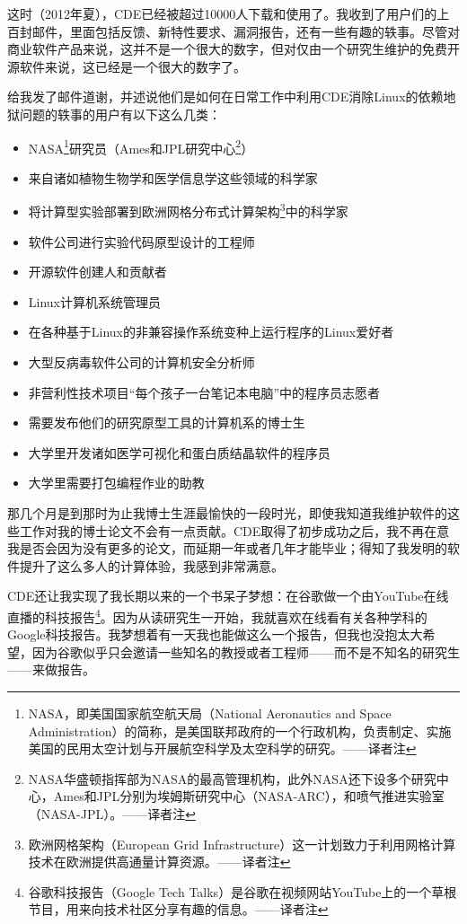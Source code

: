 \documentclass[letter,12pt]{book}
\begin{document}
\begin{CJK}{UTF8}{gbsn}
这时（2012年夏），CDE已经被超过10000人下载和使用了。我收到了用户们的上百封邮件，里面包括反馈、新特性要求、漏洞报告，还有一些有趣的轶事。尽管对商业软件产品来说，这并不是一个很大的数字，但对仅由一个研究生维护的免费开源软件来说，这已经是一个很大的数字了。

给我发了邮件道谢，并述说他们是如何在日常工作中利用CDE消除Linux的依赖地狱问题的轶事的用户有以下这么几类：
\begin{itemize}
  \item NASA\footnote{NASA，即美国国家航空航天局（National Aeronautics and Space Administration）的简称，是美国联邦政府的一个行政机构，负责制定、实施美国的民用太空计划与开展航空科学及太空科学的研究。——译者注}研究员（Ames和JPL研究中心\footnote{NASA华盛顿指挥部为NASA的最高管理机构，此外NASA还下设多个研究中心，Ames和JPL分别为埃姆斯研究中心（NASA-ARC），和喷气推进实验室（NASA-JPL）。——译者注}）
  \item 来自诸如植物生物学和医学信息学这些领域的科学家
  \item 将计算型实验部署到欧洲网格分布式计算架构\footnote{欧洲网格架构（European Grid Infrastructure）这一计划致力于利用网格计算技术在欧洲提供高通量计算资源。——译者注}中的科学家
  \item 软件公司进行实验代码原型设计的工程师
  \item 开源软件创建人和贡献者
  \item Linux计算机系统管理员
  \item 在各种基于Linux的非兼容操作系统变种上运行程序的Linux爱好者
  \item 大型反病毒软件公司的计算机安全分析师
  \item 非营利性技术项目“每个孩子一台笔记本电脑”中的程序员志愿者
  \item 需要发布他们的研究原型工具的计算机系的博士生
  \item 大学里开发诸如医学可视化和蛋白质结晶软件的程序员
  \item 大学里需要打包编程作业的助教
\end{itemize}
那几个月是到那时为止我博士生涯最愉快的一段时光，即使我知道我维护软件的这些工作对我的博士论文不会有一点贡献。CDE取得了初步成功之后，我不再在意我是否会因为没有更多的论文，而延期一年或者几年才能毕业；得知了我发明的软件提升了这么多人的计算体验，我感到非常满意。

\breakline

CDE还让我实现了我长期以来的一个书呆子梦想：在谷歌做一个由YouTube在线直播的科技报告\footnote{谷歌科技报告（Google Tech Talks）是谷歌在视频网站YouTube上的一个草根节目，用来向技术社区分享有趣的信息。——译者注}。因为从读研究生一开始，我就喜欢在线看有关各种学科的Google科技报告。我梦想着有一天我也能做这么一个报告，但我也没抱太大希望，因为谷歌似乎只会邀请一些知名的教授或者工程师——而不是不知名的研究生——来做报告。


\end{CJK}
\end{document}
